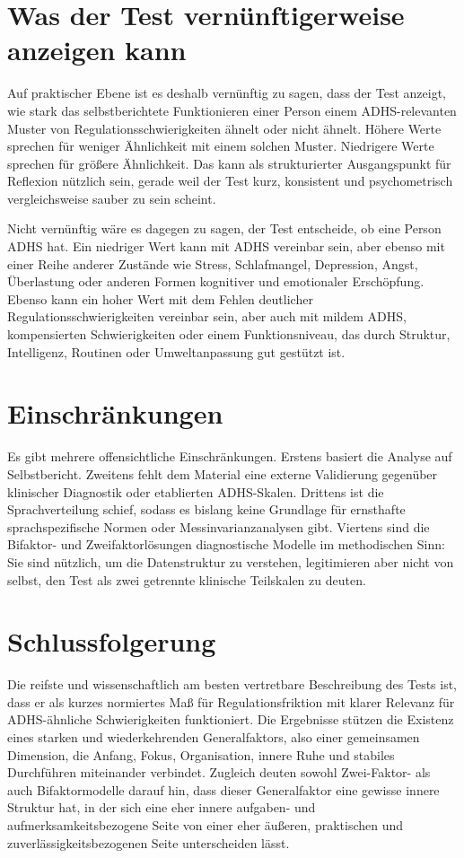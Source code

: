\documentclass[11pt,a4paper]{article}
\begin{document}
\section{Was der Test vernünftigerweise anzeigen kann}
Auf praktischer Ebene ist es deshalb vernünftig zu sagen, dass der Test anzeigt, wie stark das selbstberichtete Funktionieren einer Person einem ADHS-relevanten Muster von Regulationsschwierigkeiten ähnelt oder nicht ähnelt. Höhere Werte sprechen für weniger Ähnlichkeit mit einem solchen Muster. Niedrigere Werte sprechen für größere Ähnlichkeit. Das kann als strukturierter Ausgangspunkt für Reflexion nützlich sein, gerade weil der Test kurz, konsistent und psychometrisch vergleichsweise sauber zu sein scheint.

Nicht vernünftig wäre es dagegen zu sagen, der Test entscheide, ob eine Person ADHS hat. Ein niedriger Wert kann mit ADHS vereinbar sein, aber ebenso mit einer Reihe anderer Zustände wie Stress, Schlafmangel, Depression, Angst, Überlastung oder anderen Formen kognitiver und emotionaler Erschöpfung. Ebenso kann ein hoher Wert mit dem Fehlen deutlicher Regulationsschwierigkeiten vereinbar sein, aber auch mit mildem ADHS, kompensierten Schwierigkeiten oder einem Funktionsniveau, das durch Struktur, Intelligenz, Routinen oder Umweltanpassung gut gestützt ist.

\section{Einschränkungen}
Es gibt mehrere offensichtliche Einschränkungen. Erstens basiert die Analyse auf Selbstbericht. Zweitens fehlt dem Material eine externe Validierung gegenüber klinischer Diagnostik oder etablierten ADHS-Skalen. Drittens ist die Sprachverteilung schief, sodass es bislang keine Grundlage für ernsthafte sprachspezifische Normen oder Messinvarianzanalysen gibt. Viertens sind die Bifaktor- und Zweifaktorlösungen diagnostische Modelle im methodischen Sinn: Sie sind nützlich, um die Datenstruktur zu verstehen, legitimieren aber nicht von selbst, den Test als zwei getrennte klinische Teilskalen zu deuten.

\section{Schlussfolgerung}
Die reifste und wissenschaftlich am besten vertretbare Beschreibung des Tests ist, dass er als kurzes normiertes Maß für Regulationsfriktion mit klarer Relevanz für ADHS-ähnliche Schwierigkeiten funktioniert. Die Ergebnisse stützen die Existenz eines starken und wiederkehrenden Generalfaktors, also einer gemeinsamen Dimension, die Anfang, Fokus, Organisation, innere Ruhe und stabiles Durchführen miteinander verbindet. Zugleich deuten sowohl Zwei-Faktor- als auch Bifaktormodelle darauf hin, dass dieser Generalfaktor eine gewisse innere Struktur hat, in der sich eine eher innere aufgaben- und aufmerksamkeitsbezogene Seite von einer eher äußeren, praktischen und zuverlässigkeitsbezogenen Seite unterscheiden lässt.
\end{document}
